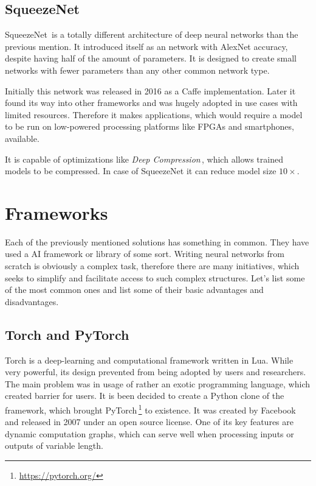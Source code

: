 \subsection{SqueezeNet}

SqueezeNet\,\cite{squeezenet} is a totally different architecture of deep neural networks than the previous mention. It introduced itself as an network with AlexNet accuracy, despite having half of the amount of parameters. It is designed to create small networks with fewer parameters than any other common network type.

Initially this network was released in 2016 as a Caffe implementation. Later it found its way into other frameworks and was hugely adopted in use cases with limited resources. Therefore it makes applications, which would require a model to be run on low-powered processing platforms like FPGAs and smartphones, available.

It is capable of optimizations like \textit{Deep Compression}\,\cite{compression}, which allows trained models to be compressed. In case of SqueezeNet it can reduce model size $10\times$.

\section{Frameworks}

Each of the previously mentioned solutions has something in common. They have used a AI framework or library of some sort. Writing neural networks from scratch is obviously a complex task, therefore there are many initiatives, which seeks to simplify and facilitate access to such complex structures. Let's list some of the most common ones and list some of their basic advantages and disadvantages.

\subsection{Torch and PyTorch}

Torch is a deep-learning and computational framework written in Lua. While very powerful, its design prevented from being adopted by users and researchers. The main problem was in usage of rather an exotic programming language, which created barrier for users. It is been decided to create a Python clone of the framework, which brought PyTorch\,\footnote{\url{https://pytorch.org/}} to existence. It was created by Facebook and released in 2007 under an open source license. One of its key features are dynamic computation graphs, which can serve well when processing inputs or outputs of variable length.

